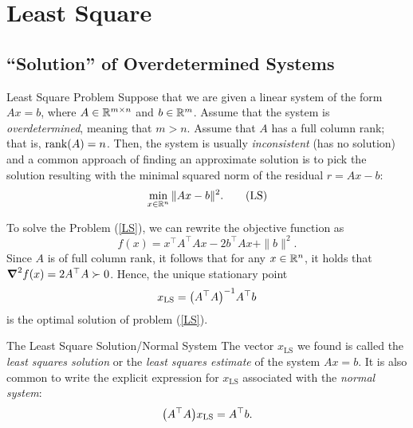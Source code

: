 \newpage
\section{Least Square}
\subsection{``Solution'' of Overdetermined Systems}
\begin{df}{Least Square Problem}
	Suppose that we are given a linear system of the form $Ax=b$, where $A\in{\mathbb{R}}^{m\times n}$ and $b\in{\mathbb{R}}^m$. Assume that the system is \textit{overdetermined}, meaning that $m>n$. Assume that $A$ has a full column rank; that is, $\rank(A)=n$. Then, the system is usually \textit{inconsistent} (has no solution) and a common approach of finding an approximate solution is to pick the solution resulting with the minimal squared norm of the residual $r=Ax-b$: \begin{equation}\label{LS}\min_{x\in{\mathbb{R}}^n}\|Ax-b\|^2.\tag{LS}\end{equation}
\end{df}
\begin{sol}
	To solve the Problem (\ref{LS}), we can rewrite the objective function as \[f(x)=x^\top A^\top Ax-2b^\top Ax+\|b\|^2.\] Since $A$ is of full column rank, it follows that for any $x\in{\mathbb{R}}^n$, it holds that $\grad^2f(x)=2A^\top A\succ0$. Hence, the unique stationary point \[x_\text{LS}=\qty(A^\top A)^{-1}A^\top b\] is the optimal solution of problem (\ref{LS}).  
\end{sol}
\begin{df}{The Least Square Solution/Normal System}
	The vector $x_\text{LS}$ we found is called the \textit{least squares solution} or the \textit{least squares estimate} of the system $Ax=b$. It is also common to write the explicit expression for $x_\text{LS}$ associated with the \textit{normal system}: \[\qty(A^\top A)x_\text{LS}=A^\top b.\]
\end{df}

